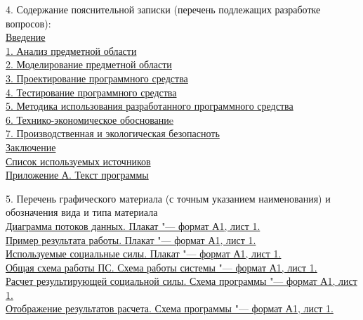 {  \small{4. Содержание пояснительной записки (перечень подлежащих разработке вопросов):} \\[1em]
  \uline{\small{Введение}}\lineunderscore\\
  \uline{\small{1. Анализ предметной области}}\lineunderscore\\
  \uline{\small{2. Моделирование предметной области}}\lineunderscore\\
  \uline{\small{3. Проектирование программного средства}}\lineunderscore\\
  \uline{\small{4. Тестирование программного средства}}\lineunderscore\\
  \uline{\small{5. Методика использования разработанного программного средства}}\lineunderscore\\
  \uline{\small{6. Технико-экономическое обоснованиe}}\lineunderscore\\
  \uline{\small{7. Производственная и экологическая безопасноть}}\lineunderscore\\
  \uline{\small{Заключение}}\lineunderscore\\
  \uline{\small{Список используемых источников}}\lineunderscore\\
  \uline{\small{Приложение А. Текст программы}}\lineunderscore

  \clearpage
  \thispagestyle{empty}

  \small{5. Перечень графического материала (с точным указанием наименования) и обозначения вида и типа материала} \\
  \uline{\small{Диаграмма потоков данных. Плакат "--- формат А1, лист 1.}}\lineunderscore\\
  \uline{\small{Пример результата работы. Плакат "--- формат А1, лист 1.}}\lineunderscore\\
  \uline{\small{Используемые социальные силы. Плакат "--- формат А1, лист 1.}}\lineunderscore\\
  \uline{\small{Общая схема работы ПС. Схема работы системы "--- формат А1, лист 1.}}\lineunderscore\\
  \uline{\small{Расчет результирующей социальной силы. Схема программы "--- формат А1, лист 1.}}\lineunderscore\\
  \uline{\small{Отображение результатов расчета. Схема программы "--- формат А1, лист 1.}}\lineunderscore\\
  \lineunderscore\\
  \lineunderscore

  \vspace{1em}

}
